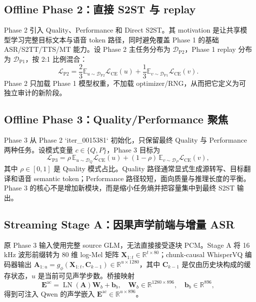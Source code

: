 \documentclass[11pt,a4paper]{article}
\newcommand{\vect}[1]{\bm{#1}}
\newcommand{\mat}[1]{\bm{#1}}
\newcommand{\R}{\mathbb{R}}
\newcommand{\Loss}{\mathcal{L}}
\newcommand{\E}{\mathbb{E}}
\begin{document}
\subsection{Offline Phase 2：直接 S2ST 与 replay}

Phase 2 引入 Quality、Performance 和 Direct S2ST。其 motivation 是让共享模型学习完整目标文本与语音 token 路径，同时避免覆盖 Phase 1 的基础 ASR/S2TT/TTS/MT 能力。设 Phase 2 主任务分布为 $\mathcal{D}_{\mathrm{P2}}$，Phase 1 replay 分布为 $\mathcal{D}_{\mathrm{P1}}$，按 2:1 比例混合：
\begin{equation}
 \Loss_{\mathrm{P2}}
 =\frac{2}{3}\E_{u\sim\mathcal{D}_{\mathrm{P2}}}\Loss_{\mathrm{CE}}(u)
 +\frac{1}{3}\E_{v\sim\mathcal{D}_{\mathrm{P1}}}\Loss_{\mathrm{CE}}(v).
 \label{eq:p2}
\end{equation}
Phase 2 只加载 Phase 1 模型权重，不加载 optimizer/RNG，从而把它定义为可独立审计的新阶段。

\subsection{Offline Phase 3：Quality/Performance 聚焦}

Phase 3 从 Phase 2 `iter\_0015381` 初始化，只保留最终 Quality 与 Performance 两种任务。设模式变量 $c\in\{Q,P\}$，Phase 3 目标为
\begin{equation}
 \Loss_{\mathrm{P3}}
 =\rho\,\E_{u\sim\mathcal{D}_{Q}}\Loss_{\mathrm{CE}}(u)
 +(1-\rho)\,\E_{v\sim\mathcal{D}_{P}}\Loss_{\mathrm{CE}}(v),
 \label{eq:p3}
\end{equation}
其中 $\rho\in[0,1]$ 是 Quality 模式占比。Quality 路径通常显式生成源转写、目标翻译和语音 semantic token；Performance 路径较短，面向质量与推理长度的平衡。Phase 3 的核心不是增加新模块，而是缩小任务熵并把容量集中到最终 S2ST 输出。

\subsection{Streaming Stage A：因果声学前端与增量 ASR}

原 Phase 3 输入使用完整 source GLM，无法直接接受逐块 PCM。Stage A 将 16\,kHz 波形前缀转为 80 维 log-Mel 矩阵 $\mat{X}_{1:t}\in\R^{t\times80}$；chunk-causal WhisperVQ 编码器输出 $\mat{A}_{1:u}=g_\phi(\mat{X}_{1:t},\mat{C}_{k-1})\in\R^{u\times1280}$，其中 $\mat{C}_{k-1}$ 是仅由历史块构成的缓存状态，$u$ 是当前可见声学步数。桥接映射
\begin{equation}
 \mat{E}^{\mathrm{ac}}=\operatorname{LN}(\mat{A})\mat{W}_{b}+\vect{b}_{b},
 \quad \mat{W}_{b}\in\R^{1280\times896},
 \quad \vect{b}_{b}\in\R^{896},
 \label{eq:bridge}
\end{equation}
得到可注入 Qwen 的声学嵌入 $\mat{E}^{\mathrm{ac}}\in\R^{u\times896}$。
\end{document}
